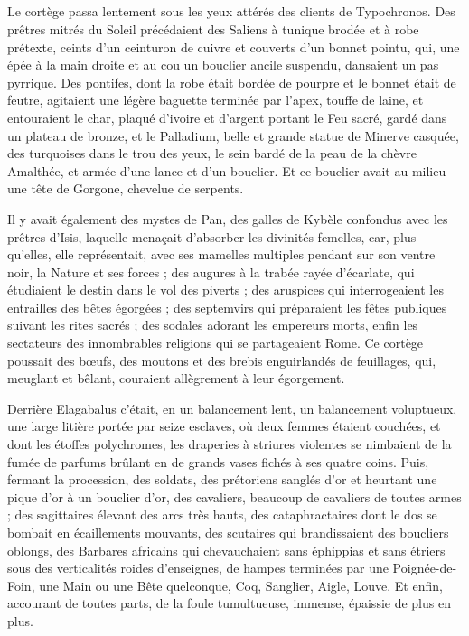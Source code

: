 \documentclass[a4paper, 11pt, oneside, polutonikogreek, french]{article}
\begin{document}
\subsection{}
\paragraph{}
Le cortège passa lentement sous les yeux attérés des clients de Typochronos. Des prêtres mitrés du Soleil précédaient des Saliens à tunique brodée et à robe prétexte, ceints d'un ceinturon de cuivre et couverts d'un bonnet pointu, qui, une épée à la main droite et au cou un bouclier ancile suspendu, dansaient un pas pyrrique. Des pontifes, dont la robe était bordée de pourpre et le bonnet était de feutre, agitaient une légère baguette terminée par l'apex, touffe de laine, et entouraient le char, plaqué d'ivoire et d'argent portant le Feu sacré, gardé dans un plateau de bronze, et le Palladium, belle et grande statue de Minerve casquée, des turquoises dans le trou des yeux, le sein bardé de la peau de la chèvre Amalthée, et armée d'une lance et d'un bouclier. Et ce bouclier avait au milieu une tête de Gorgone, chevelue de serpents.

Il y avait également des mystes de Pan, des galles de Kybèle confondus avec les prêtres d'Isis, laquelle menaçait d'absorber les divinités femelles, car, plus qu'elles, elle représentait, avec ses mamelles multiples pendant sur son ventre noir, la Nature et ses forces ; des augures à la trabée rayée d'écarlate, qui étudiaient le destin dans le vol des piverts ; des aruspices qui interrogeaient les entrailles des bêtes égorgées ; des septemvirs qui préparaient les fêtes publiques suivant les rites sacrés ; des sodales adorant les empereurs morts, enfin les sectateurs des innombrables religions qui se partageaient Rome. Ce cortège poussait des bœufs, des moutons et des brebis enguirlandés de feuillages, qui, meuglant et bêlant, couraient allègrement à leur égorgement.

Derrière Elagabalus c'était, en un balancement lent, un balancement voluptueux, une large litière portée par seize esclaves, où deux femmes étaient couchées, et dont les étoffes polychromes, les draperies à striures violentes se nimbaient de la fumée de parfums brûlant en de grands vases fichés à ses quatre coins. Puis, fermant la procession, des soldats, des prétoriens sanglés d'or et heurtant une pique d'or à un bouclier d'or, des cavaliers, beaucoup de cavaliers de toutes armes ; des sagittaires élevant des arcs très hauts, des cataphractaires dont le dos se bombait en écaillements mouvants, des scutaires qui brandissaient des boucliers oblongs, des Barbares africains qui chevauchaient sans éphippias et sans étriers sous des verticalités roides d'enseignes, de hampes terminées par une Poignée-de-Foin, une Main ou une Bête quelconque, Coq, Sanglier, Aigle, Louve. Et enfin, accourant de toutes parts, de la foule tumultueuse, immense, épaissie de plus en plus.
\end{document}
